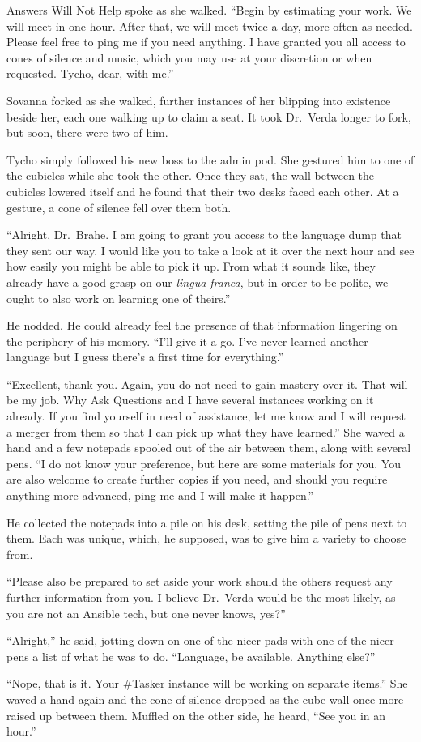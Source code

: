 Answers Will Not Help spoke as she walked. ``Begin by estimating your work. We will meet in one hour. After that, we will meet twice a day, more often as needed. Please feel free to ping me if you need anything. I have granted you all access to cones of silence and music, which you may use at your discretion or when requested. Tycho, dear, with me.''

Sovanna forked as she walked, further instances of her blipping into existence beside her, each one walking up to claim a seat. It took Dr.~Verda longer to fork, but soon, there were two of him.

Tycho simply followed his new boss to the admin pod. She gestured him to one of the cubicles while she took the other. Once they sat, the wall between the cubicles lowered itself and he found that their two desks faced each other. At a gesture, a cone of silence fell over them both.

``Alright, Dr.~Brahe. I am going to grant you access to the language dump that they sent our way. I would like you to take a look at it over the next hour and see how easily you might be able to pick it up. From what it sounds like, they already have a good grasp on our \emph{lingua franca}, but in order to be polite, we ought to also work on learning one of theirs.''

He nodded. He could already feel the presence of that information lingering on the periphery of his memory. ``I'll give it a go. I've never learned another language but I guess there's a first time for everything.''

``Excellent, thank you. Again, you do not need to gain mastery over it. That will be my job. Why Ask Questions and I have several instances working on it already. If you find yourself in need of assistance, let me know and I will request a merger from them so that I can pick up what they have learned.'' She waved a hand and a few notepads spooled out of the air between them, along with several pens. ``I do not know your preference, but here are some materials for you. You are also welcome to create further copies if you need, and should you require anything more advanced, ping me and I will make it happen.''

He collected the notepads into a pile on his desk, setting the pile of pens next to them. Each was unique, which, he supposed, was to give him a variety to choose from.

``Please also be prepared to set aside your work should the others request any further information from you. I believe Dr.~Verda would be the most likely, as you are not an Ansible tech, but one never knows, yes?''

``Alright,'' he said, jotting down on one of the nicer pads with one of the nicer pens a list of what he was to do. ``Language, be available. Anything else?''

``Nope, that is it. Your \#Tasker instance will be working on separate items.'' She waved a hand again and the cone of silence dropped as the cube wall once more raised up between them. Muffled on the other side, he heard, ``See you in an hour.''
